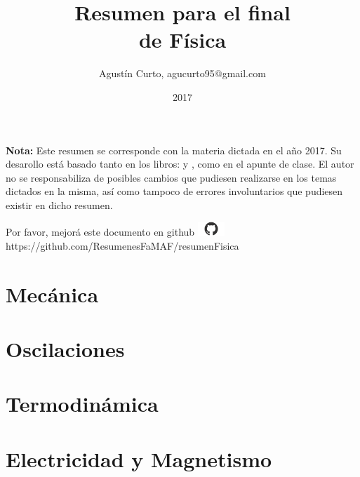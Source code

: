 \documentclass[12pt,a4paper]{article}
\author{Agustín Curto, agucurto95@gmail.com}
\title{Resumen para el final \\ de Física}
\date{2017}
\newcommand{\PN}{\par\noindent}
\begin{document}
	\clearpage\maketitle
	\thispagestyle{empty}
	\tableofcontents

	\vspace{5cm}
	\PN \textbf{Nota:} Este resumen se corresponde con la materia dictada en el año 2017. Su desarollo está basado tanto
	en los libros: \cite{1} y \cite{2}, como en el apunte de clase. El autor no se responsabiliza de posibles cambios que
	pudiesen realizarse en los temas dictados en la misma, así como tampoco de errores involuntarios que pudiesen existir
	en dicho resumen.

	
	

	\vspace{\fill}
	\begin{center}
		Por favor, mejorá este documento en github
		\includegraphics[width=1cm]{graphics/github.png} \\
		https://github.com/ResumenesFaMAF/resumenFisica
	\end{center}

	\pagebreak

	\part{Mecánica}
		
		
		
		
		
		
		
		
		
		
		

	\part{Oscilaciones}
		

	\part{Termodinámica}
		
		
		
		
		
		
		
		
		

	\part{Electricidad y Magnetismo}
		
		
		
		
		
		
\end{document}
